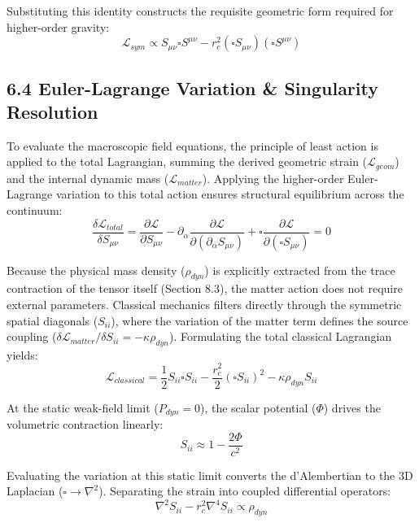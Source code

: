 Substituting this identity constructs the requisite geometric form required for higher-order gravity: 
\begin{equation}
    \mathcal{L}_{sym} \propto S_{\mu\nu} \square S^{\mu\nu} - r_c^2 (\square S_{\mu\nu})(\square S^{\mu\nu})
\end{equation}




\subsection*{6.4 Euler-Lagrange Variation \& Singularity Resolution}
To evaluate the macroscopic field equations, the principle of least action is applied to the total Lagrangian, summing the derived geometric strain ($\mathcal{L}_{geom}$) and the internal dynamic mass ($\mathcal{L}_{matter}$). Applying the higher-order Euler-Lagrange variation to this total action ensures structural equilibrium across the continuum: 
\begin{equation}
    \frac{\delta \mathcal{L}_{total}}{\delta S_{\mu\nu}} = \frac{\partial \mathcal{L}}{\partial S_{\mu\nu}} - \partial_\alpha \frac{\partial \mathcal{L}}{\partial (\partial_\alpha S_{\mu\nu})} + \square \frac{\partial \mathcal{L}}{\partial (\square S_{\mu\nu})} = 0
\end{equation}

Because the physical mass density ($\rho_{dyn}$) is explicitly extracted from the trace contraction of the tensor itself (Section 8.3), the matter action does not require external parameters. Classical mechanics filters directly through the symmetric spatial diagonals ($S_{ii}$), where the variation of the matter term defines the source coupling ($\delta \mathcal{L}_{matter}/\delta S_{ii} = -\kappa \rho_{dyn}$). Formulating the total classical Lagrangian yields: 
\begin{equation}
    \mathcal{L}_{classical} = \frac{1}{2} S_{ii} \square S_{ii} - \frac{r_c^2}{2} (\square S_{ii})^2 - \kappa \rho_{dyn} S_{ii} 
\end{equation}

At the static weak-field limit ($P_{dyn} = 0$), the scalar potential ($\Phi$) drives the volumetric contraction linearly:
\begin{equation}
    S_{ii} \approx 1 - \frac{2\Phi}{c^2} \label{eq:tensor_weak_field}
\end{equation}

Evaluating the variation at this static limit converts the d'Alembertian to the 3D Laplacian ($\square \to \nabla^2$). Separating the strain into coupled differential operators:
\begin{equation}
    \nabla^2 S_{ii} - r_c^2 \nabla^4 S_{ii} \propto \rho_{dyn}
\end{equation}

